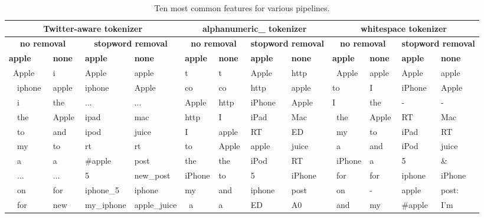 \documentclass[letterpaper]{article}
\begin{document}
\begin{table}[ht]
\centering
\begin{tabular}{|l|l|l|l|l|l|l|l|l|l|l|l|}
\hline
\multicolumn{4}{|c|}{\textbf{Twitter-aware tokenizer}} & \multicolumn{4}{|c|}{\textbf{alphanumeric\_ tokenizer}} & \multicolumn{4}{|c|}{\textbf{whitespace tokenizer}} \\
\hline
\multicolumn{2}{|c|}{\textbf{no removal}} & \multicolumn{2}{|c|}{\textbf{stopword removal}} &\multicolumn{2}{|c|}{\textbf{no removal}} & \multicolumn{2}{|c|}{\textbf{stopword removal}} &\multicolumn{2}{|c|}{\textbf{no removal}} & \multicolumn{2}{|c|}{\textbf{stopword removal}}\\
\hline
\textbf{apple} & \textbf{none} & \textbf{apple} & \textbf{none} & \textbf{apple} & \textbf{none} & \textbf{apple} & \textbf{none} & \textbf{apple} & \textbf{none} & \textbf{apple} & \textbf{none} \\ \hline
  Apple  & i     & Apple      & apple        & t        & t     & Apple  & http   & Apple  & apple & Apple   & apple  \\
  iphone & apple & iphone     & Apple        & co       & co    & http   & apple  & to     & I     & iPhone  & Apple  \\
  i      & the   & ...        & ...          & Apple    & http  & iPhone & Apple  & I      & the   & -       & -      \\
  the    & Apple & ipad       & mac          & http     & I     & iPad   & Mac    & the    & Apple & RT      & Mac    \\
  to     & and   & ipod       & juice        & I        & apple & RT     & ED     & my     & to    & iPad    & RT     \\ 
  my     & to    & rt         & rt           & to       & Apple & apple  & juice  & a      & and   & iPod    & juice  \\
  a      & a     & \#apple    & post         & the      & the   & iPod   & RT     & iPhone & a     & 5       & \&     \\
  ...    & ...   & 5          & new\_post    & iPhone   & to    & 5      & iPhone & for    & for   & iphone  & iPhone \\
  on     & for   & iphone\_5  & iphone       & my       & and   & iphone & post   & on     & -     & apple   & post:  \\
  for    & new   & my\_iphone & apple\_juice & a        & a     & ED     & A0     & and    & my    & \#apple & I'm    \\ \hline
\end{tabular}
\caption{Ten most common features for various pipelines.}
\end{table}
\end{document}
